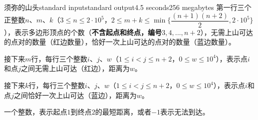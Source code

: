 \begin{problem}{须弥的山头}{standard input}{standard output}{4.5 seconds}{256 megabytes}
\InputFile
第一行三个正整数$n$、$m$、$k$（$3 \le n \le 2 \cdot 10^5$，$2 \le m + k \le \min\{\dfrac{(n + 1)(n + 2)}{2}, 2 \cdot 10^5\}$），表示多边形顶点的个数（\textbf {不含起点和终点，编号$3, 4, ..., n + 2$}），无需上山可达的点对的数量（红边数量），恰好一次上山可达的点对的数量（蓝边数量）。

接下来$m$行，每行三个整数$i$、$j$、$w$（$1 \le i < j \le n + 2$，$0 \le w \le 10^4$），表示点$i$和点$j$之间无需上山可达（红边），距离为$w$。

接下来$k$行，每行三个整数$i$、$j$、$w$（$1 \le i < j \le n + 2$，$0 \le w \le 10^4$），表示点$i$和点$j$之间恰好一次上山可达（蓝边），距离为$w$。


\OutputFile
一个整数，表示起点$1$到终点$2$的最短距离，或者$-1$表示无法到达。

\Examples

\begin{example}
%
%
%
\end{example}

\end{problem}

